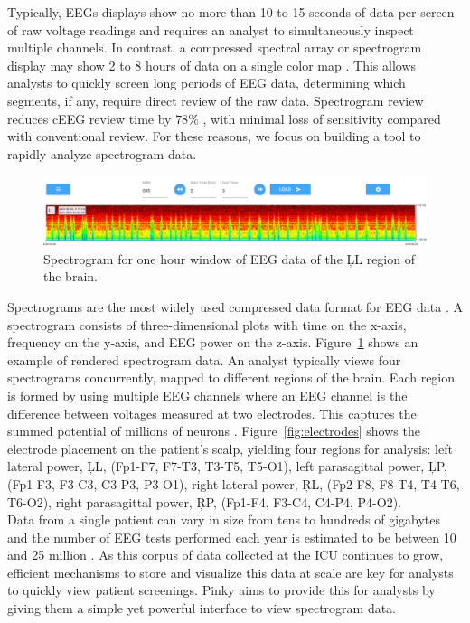 Typically, EEGs displays show no more than 10 to 15 seconds of data per screen
of raw voltage readings and requires an analyst to simultaneously inspect
multiple channels. In contrast, a compressed spectral array \cite{csa} or
spectrogram display may show 2 to 8 hours of data on a single color map
\cite{ceeg-3}. This allows analysts to quickly screen long periods of EEG data,
determining which segments, if any, require direct review of the raw data.
Spectrogram review reduces cEEG review time by $78\%$ \cite{ceeg-2}, with
minimal loss of sensitivity compared with conventional review. For these
reasons, we focus on building a tool to rapidly analyze spectrogram data. \\

\begin{figure}[h]
\begin{center}
\includegraphics[scale=0.35]{./img/eeg-view.png}
\caption{Spectrogram for one hour window of EEG data of the \c{LL} region of
  the brain.}
\label{fig:eeg-view}
\end{center}
\end{figure}

Spectrograms are the most widely used compressed data format for EEG data
\cite{ceeg-1}. A spectrogram consists of three-dimensional plots with time on
the x-axis, frequency on the y-axis, and EEG power on the z-axis.
Figure~\ref{fig:eeg-view} shows an example of rendered spectrogram data. An
analyst typically views four spectrograms concurrently, mapped to different
regions of the brain. Each region is formed by using multiple EEG channels
where an EEG channel is the difference between voltages measured at two
electrodes. This captures the summed potential of millions of neurons
\cite{eeg-ml}.  Figure~\ref{fig:electrodes} shows the electrode placement on
the patient's scalp, yielding four regions for analysis: left lateral power,
\c{LL}, (Fp1-F7, F7-T3, T3-T5, T5-O1), left parasagittal power, \c{LP},
(Fp1-F3, F3-C3, C3-P3, P3-O1), right lateral power, \c{RL}, (Fp2-F8, F8-T4,
T4-T6, T6-O2), right parasagittal power, \c{RP}, (Fp1-F4, F3-C4, C4-P4, P4-O2).
\\

Data from a single patient can vary in size from tens to hundreds of gigabytes
and the number of EEG tests performed each year is estimated to be between 10
and 25 million \cite{eeg-scale}. As this corpus of data collected at the ICU
continues to grow, efficient mechanisms to store and visualize this data at
scale are key for analysts to quickly view patient screenings. Pinky aims to
provide this for analysts by giving them a simple yet powerful interface to
view spectrogram data.

